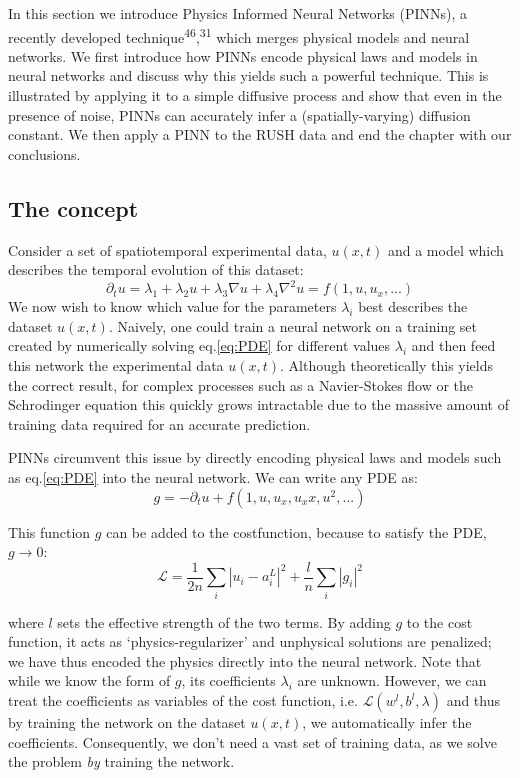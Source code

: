 \documentclass{Dissertate}
\begin{document}
In this section we introduce Physics Informed Neural Networks (PINNs), a
recently developed technique\textsuperscript{46},\textsuperscript{31}
which merges physical models and neural networks. We first introduce how
PINNs encode physical laws and models in neural networks and discuss why
this yields such a powerful technique. This is illustrated by applying
it to a simple diffusive process and show that even in the presence of
noise, PINNs can accurately infer a (spatially-varying) diffusion
constant. We then apply a PINN to the RUSH data and end the chapter with
our conclusions.

\hypertarget{the-concept-1}{%
\subsection{The concept}\label{the-concept-1}}

Consider a set of spatiotemporal experimental data, \(u(x,t)\) and a
model which describes the temporal evolution of this dataset:
\begin{equation}
\partial_t u = \lambda_1 + \lambda_2 u + \lambda_3\nabla u + \lambda_4 \nabla^2 u = f(1, u, u_x, ...)
\label{eq:PDE}\end{equation} We now wish to know which value for the
parameters \(\lambda_i\) best describes the dataset \(u(x,t)\). Naively,
one could train a neural network on a training set created by
numerically solving eq.\ref{eq:PDE} for different values
\(\lambda_{i}\) and then feed this network the experimental data
\(u(x,t)\). Although theoretically this yields the correct result, for
complex processes such as a Navier-Stokes flow or the Schrodinger
equation this quickly grows intractable due to the massive amount of
training data required for an accurate prediction.

PINNs circumvent this issue by directly encoding physical laws and
models such as eq.\ref{eq:PDE} into the neural network. We can write
any PDE as: \begin{equation}
g = -\partial_t u + f(1, u, u_x, u_xx, u^2, ...)
\label{eq:PIcost}\end{equation}

This function \(g\) can be added to the costfunction, because to satisfy
the PDE, \(g \to 0\): \[
\mathcal{L} = \frac{1}{2n}\sum_i|u_i-a^L_i|^2 + \frac{l}{n}\sum_i|g_i|^2
\]

where \(l\) sets the effective strength of the two terms. By adding
\(g\) to the cost function, it acts as `physics-regularizer' and
unphysical solutions are penalized; we have thus encoded the physics
directly into the neural network. Note that while we know the form of
\(g\), its coefficients \(\lambda_i\) are unknown. However, we can treat
the coefficients as variables of the cost function, i.e.
\(\mathcal{L}(w^l,b^l, \lambda)\) and thus by training the network on
the dataset \(u(x,t)\), we automatically infer the coefficients.
Consequently, we don't need a vast set of training data, as we solve the
problem \emph{by} training the network.
\end{document}
